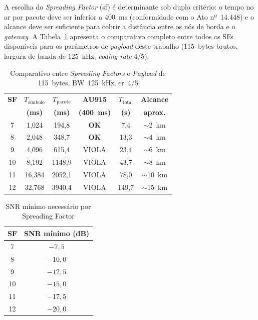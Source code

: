 A escolha do \textit{Spreading Factor} (\gls{sf}) é determinante sob duplo critério: o tempo
no ar por pacote deve ser inferior a 400~ms (conformidade com o Ato nº~14.448) e o
alcance deve ser suficiente para cobrir a distância entre os nós de borda e o
\textit{gateway}. A Tabela~\ref{tab:comparativo_sf} apresenta o comparativo completo
entre todos os SFs disponíveis para os parâmetros de \textit{\gls{payload}} deste trabalho
(115~bytes brutos, largura de banda de 125~kHz, \textit{coding rate} 4/5).
 
\begin{table}[htbp]
  \centering
  \caption{Comparativo entre \textit{Spreading Factors} e \textit{Payload} de 115~bytes, BW~125~kHz, \gls{cr}~4/5}
  \label{tab:comparativo_sf}
  \begin{tabular}{cccccc}
    \toprule
    \textbf{SF} & \textbf{$T_{\text{símbolo}}$} & \textbf{$T_{\text{pacote}}$} & \textbf{AU915} & \textbf{$T_{\text{total}}$} & \textbf{Alcance}\\
                & \textbf{(ms)}                 & \textbf{(ms)}                & \textbf{(400~ms)} & \textbf{(s)}             & \textbf{aprox.}\\
    \midrule
    7  & 1,024 & 194,8  & \textbf{OK} & 7,4  & $\sim$2~km \\
    \rowcolor{green!15}
    8  & 2,048 & 348,7  & \textbf{OK} & 13,3 & $\sim$4~km \\
    9  & 4,096 & 615,4  & VIOLA       & 23,4 & $\sim$6~km \\
    10 & 8,192 & 1148,9 & VIOLA       & 43,7 & $\sim$8~km \\
    11 & 16,384 & 2052,1 & VIOLA      & 78,0 & $\sim$10~km \\
    12 & 32,768 & 3940,4 & VIOLA      & 149,7 & $\sim$15~km \\
    \bottomrule
  \end{tabular}
\end{table}

\begin{table}[htb]
\centering
\caption{SNR mínimo necessário por Spreading Factor}
\label{tab:snr_sf}
\begin{tabular}{cc}
\toprule
\textbf{SF} & \textbf{SNR mínimo (dB)} \\
\midrule
7  & $-7{,}5$ \\
8  & $-10{,}0$ \\
9  & $-12{,}5$ \\
10 & $-15{,}0$ \\
11 & $-17{,}5$ \\
12 & $-20{,}0$ \\
\bottomrule
\end{tabular}
\end{table}
 
